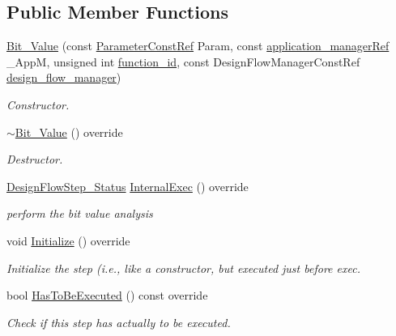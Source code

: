 \subsection*{Public Member Functions}
\begin{DoxyCompactItemize}
\item 
\hyperlink{classBit__Value_a81d98acfc22db158a1955ca04bdf3fb8}{Bit\+\_\+\+Value} (const \hyperlink{Parameter_8hpp_a37841774a6fcb479b597fdf8955eb4ea}{Parameter\+Const\+Ref} Param, const \hyperlink{application__manager_8hpp_a04ccad4e5ee401e8934306672082c180}{application\+\_\+manager\+Ref} \+\_\+\+AppM, unsigned int \hyperlink{classFunctionFrontendFlowStep_a58ef2383ad1a212a8d3f396625a4b616}{function\+\_\+id}, const Design\+Flow\+Manager\+Const\+Ref \hyperlink{classDesignFlowStep_ab770677ddf087613add30024e16a5554}{design\+\_\+flow\+\_\+manager})
\begin{DoxyCompactList}\small\item\em Constructor. \end{DoxyCompactList}\item 
\hyperlink{classBit__Value_a29d884fb981b7171381735969e63f138}{$\sim$\+Bit\+\_\+\+Value} () override
\begin{DoxyCompactList}\small\item\em Destructor. \end{DoxyCompactList}\item 
\hyperlink{design__flow__step_8hpp_afb1f0d73069c26076b8d31dbc8ebecdf}{Design\+Flow\+Step\+\_\+\+Status} \hyperlink{classBit__Value_afa7bcd5d1e9e4683bd7301de7a90e9b3}{Internal\+Exec} () override
\begin{DoxyCompactList}\small\item\em perform the bit value analysis \end{DoxyCompactList}\item 
void \hyperlink{classBit__Value_ad953c9d31beaef0358204674ef9308e5}{Initialize} () override
\begin{DoxyCompactList}\small\item\em Initialize the step (i.\+e., like a constructor, but executed just before exec. \end{DoxyCompactList}\item 
bool \hyperlink{classBit__Value_abcdc2de278483e5b1771f6f90081330a}{Has\+To\+Be\+Executed} () const override
\begin{DoxyCompactList}\small\item\em Check if this step has actually to be executed. \end{DoxyCompactList}\end{DoxyCompactItemize}
